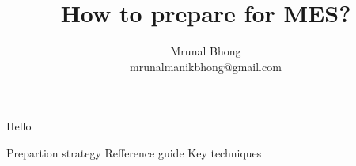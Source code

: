 \documentclass[12pt]{article}
\title{How to prepare for MES?}
\author{Mrunal Bhong\\mrunalmanikbhong@gmail.com}
\begin{document}
\maketitle
Hello

Prepartion strategy
Refference guide
Key techniques
\end{document}
